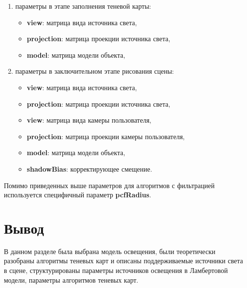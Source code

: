 \begin{enumerate}[label=\arabic*), labelsep=0.5em]
    \item параметры в этапе заполнения теневой карты:
    \begin{itemize}[label=---]
        \item \textbf{view}: матрица вида источника света,
        \item \textbf{projection}: матрица проекции источника света,
        \item \textbf{model}: матрица модели объекта,
    \end{itemize}
    \item параметры в заключительном этапе рисования сцены:
    \begin{itemize}[label=---]
        \item \textbf{view}: матрица вида источника света,
        \item \textbf{projection}: матрица проекции источника света,
        \item \textbf{view}: матрица вида камеры пользователя,
        \item \textbf{projection}: матрица проекции камеры пользователя,
        \item \textbf{model}: матрица модели объекта,
        \item \textbf{shadowBias}: корректирующее смещение.
    \end{itemize}
\end{enumerate}

Помимо приведенных выше параметров для алгоритмов с фильтрацией
используется специфичный параметр \textbf{pcfRadius}.

\section*{Вывод}

В данном разделе была выбрана модель освещения,
были теоретически разобраны алгоритмы теневых карт и
описаны поддерживаемые источники света в сцене,
структурированы параметры источников освещения в
Ламбертовой модели, параметры алгоритмов теневых карт.



